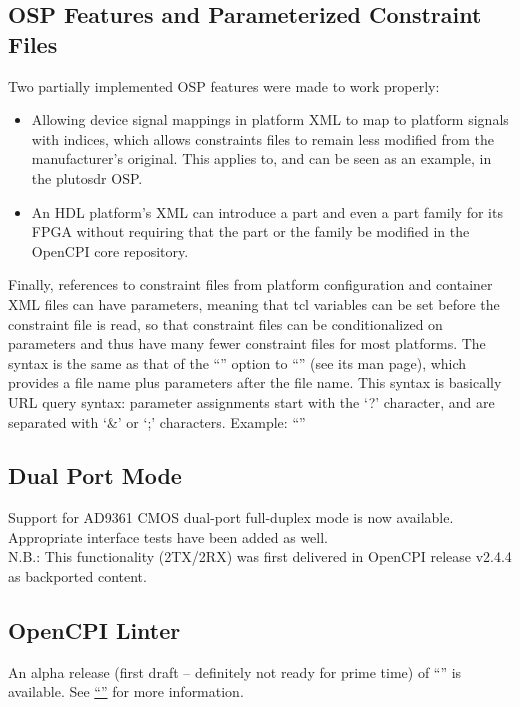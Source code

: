 \subsection{OSP Features and Parameterized Constraint Files}
\label{sec:25_signal}
Two partially implemented OSP features were made to work properly:
\begin{itemize}
\setlength\itemsep{0em} %
\item Allowing device signal mappings in platform XML to map to platform signals with indices, which allows constraints files to remain less modified from the manufacturer's original.  This applies to, and can be seen as an example, in the plutosdr OSP.
\item An HDL platform's XML can introduce a part and even a part family for its FPGA without requiring that the part or the family be modified in the OpenCPI core repository.
\end{itemize}
Finally, references to constraint files from platform configuration and container XML files can have parameters, meaning that tcl variables can be set before the constraint file is read, so that constraint files can be conditionalized on parameters and thus have many fewer constraint files for most platforms.  The syntax is the same as that of the ``'' option to ``'' (see its man page), which provides a file name plus parameters after the file name.  This syntax is basically URL query syntax: parameter assignments start with the `?' character, and are separated with `\&' or `;' characters.  Example:  ``''\\

\subsection{ Dual Port Mode}
\label{sec:25_dual}
Support for AD9361 CMOS dual-port full-duplex mode is now available.  Appropriate interface tests have been added as well.\\

N.B.: This functionality (2TX/2RX) was first delivered in OpenCPI release v2.4.4 as backported content.\\

\subsection{OpenCPI Linter}
\label{sec:25_lint}
An alpha release (first draft -- definitely not ready for prime time) of ``'' is available.  See \href{https://gitlab.com/opencpi/opencpi/-/merge_requests/1076}{``''} for more information.\\

